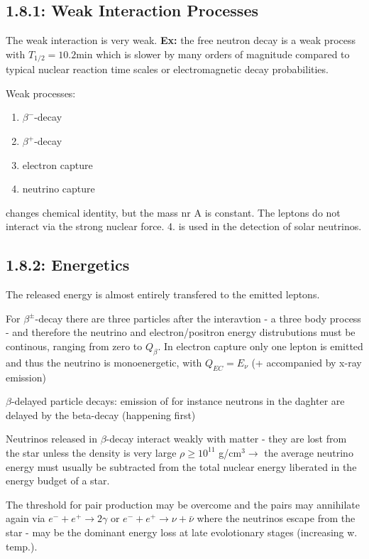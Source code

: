 \documentclass[a4paper,12pt]{article}
\begin{document}
\subsection*{1.8.1: Weak Interaction Processes}
The weak interaction is very weak. \textbf{Ex:} the free neutron decay is a weak process with $T_{1/2} = 10.2$min which is slower by many orders of magnitude compared to typical nuclear reaction time scales or electromagnetic decay probabilities.  

Weak processes:
\begin{enumerate}
\item $\beta^-$-decay
\item $\beta^+$-decay
\item electron capture
\item neutrino capture
\end{enumerate}
changes chemical identity, but the mass nr A is constant. The leptons do not interact via the strong nuclear force. 4. is used in the detection of solar neutrinos.

\subsection*{1.8.2: Energetics}
The released energy is almost entirely transfered to the emitted leptons. 

For $\beta^\pm$-decay there are three  particles after the interavtion - a three body process - and therefore the neutrino and electron/positron energy distrubutions must be continous, ranging from zero to $Q_\beta$. In electron capture only one lepton is emitted and thus the neutrino is monoenergetic, with $Q_{EC} = E_\nu$ (+ accompanied by  x-ray emission)

$\beta$-delayed particle decays: emission of for instance neutrons in the daghter are delayed by the beta-decay (happening first)

Neutrinos released in $\beta$-decay interact weakly with matter - they are lost from the star unless the density is very large $\rho \geq 10^{11}$ g/cm${}^3 \rightarrow$ the average neutrino energy must usually be subtracted from the total nuclear energy liberated in the energy budget of a star. 

The threshold for pair production may be overcome and the pairs may annihilate again via $e^- + e^+ \rightarrow 2\gamma$ or $e^- + e^+ \rightarrow \nu + \bar{\nu} $ where the neutrinos escape from the star - may be the dominant energy loss at late evolotionary stages (increasing w. temp.).
\end{document}
